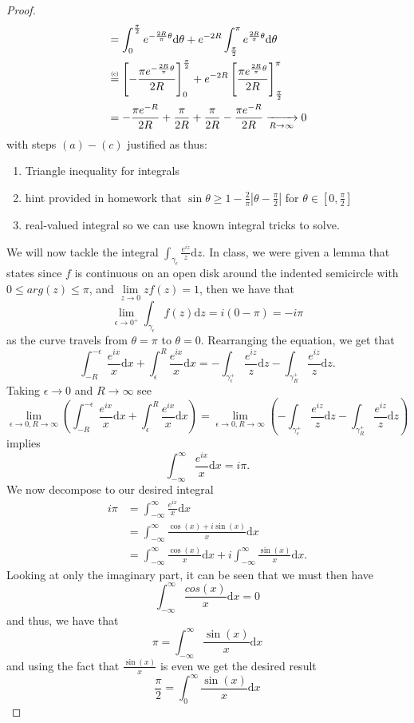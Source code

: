 \documentclass{article}
\newcommand\numeq[1]%
  {\stackrel{\scriptscriptstyle(\mkern-1.5mu#1\mkern-1.5mu)}{=}}
\begin{document}
\begin{proof}
\begin{align*}
    &= \int_0^{\frac{\pi}{2}}e^{-\frac{2R}{\pi}\theta} \mathrm{d} \theta + e^{-2R} \int_{\frac{\pi}{2}}^{\pi}e^{\frac{2R}{\pi}\theta}\mathrm{d}\theta \\
    &\numeq{c}\left[-\frac{\pi e^{-\frac{2R}{\pi}\theta}}{2R} \right]_0^{\frac{\pi}{2}} + e^{-2R}\left[\frac{\pi e^{\frac{2R}{\pi}\theta}}{2R} \right]_{\frac{\pi}{2}}^{\pi} \\
    &= -\frac{\pi e^{-R}}{2R} + \frac{\pi}{2R} + \frac{\pi}{2R} - \frac{\pi e^{-R}}{2R} \xrightarrow[R \to \infty]{} 0
  \end{align*}
  with steps $(a)-(c)$ justified as thus:
  \begin{enumerate}[\indent(a)]
   \item Triangle inequality for integrals
   \item hint provided in homework that $\sin \theta \geq 1 - \frac{2}{\pi}\left|\theta -\frac{\pi}{2}\right|$ for $\theta \in \left[0, \frac{\pi}{2} \right]$
   \item real-valued integral so we can use known integral tricks to solve. 
  \end{enumerate}
  We will now tackle the integral $\int_{\gamma_{\epsilon}}\frac{e^{iz}}{z} \mathrm{d}z$. In class, we were given a lemma that states since $f$ is continuous on an open disk around the indented semicircle with $0 \leq arg(z) \leq \pi$, and $\lim\limits_{z \to 0}z f(z) = 1$, then we have that 
  \[
  \lim\limits_{\epsilon \to 0^+} \int_{\gamma_{\epsilon}}f(z) \mathrm{d}z = i(0 - \pi) = -i \pi  
  \] 
  as the curve travels from $\theta = \pi$ to $ \theta = 0$.
  Rearranging the equation, we get that 
  \[
    \int_{-R}^{-\epsilon} \frac{e^{ix}}{x}\mathrm{d}x + \int_{\epsilon}^{R}\frac{e^{ix}}{x}\mathrm{d}x  =  -\int_{\gamma_{\epsilon}^+}\frac{e^{iz}}{z} \mathrm{d}z - \int_{\gamma_R^+}\frac{e^{iz}}{z}\mathrm{d}z.
  \]
  Taking $\epsilon \to 0$ and $R \to \infty$ see 
  \[
  \lim\limits_{\epsilon \to 0, R \to \infty} \left(\int_{-R}^{-\epsilon} \frac{e^{ix}}{x}\mathrm{d}x + \int_{\epsilon}^{R}\frac{e^{ix}}{x}\mathrm{d}x \right) =\lim\limits_{\epsilon \to 0, R \to \infty} \left(  -\int_{\gamma_{\epsilon}^+}\frac{e^{iz}}{z} \mathrm{d}z - \int_{\gamma_R^+}\frac{e^{iz}}{z}\mathrm{d}z \right) 
  \]
  implies
\[
  \int_{-\infty}^{\infty} \frac{e^{ix}}{x} \mathrm{d}x = i \pi. 
\]
We now decompose to our desired integral
\begin{align*}
  i \pi &= \int_{-\infty}^{\infty} \frac{e^{ix}}{x} \mathrm{d}x \\
  &= \int_{-\infty}^{\infty} \frac{\cos(x) + i\sin(x)}{x} \mathrm{d}x \\
  &= \int_{-\infty}^{\infty} \frac{\cos(x)}{x} \mathrm{d}x + i\int_{-\infty}^{\infty} \frac{\sin(x)}{x}\mathrm{d}x.
\end{align*} 
Looking at only the imaginary part, it can be seen that we must then have 
\[
 \int_{-\infty}^{\infty} \frac{cos(x)}{x}\mathrm{d}x = 0 
\]
and thus, we have that 
\[
 \pi = \int_{-\infty}^{\infty} \frac{\sin(x)}{x}\mathrm{d}x 
\]
and using the fact that $\frac{\sin(x)}{x}$ is even we get the desired result
\[
 \frac{\pi}{2} = \int_0^{\infty}\frac{\sin(x)}{x} \mathrm{d}x
\]

\end{proof}
\end{document}
